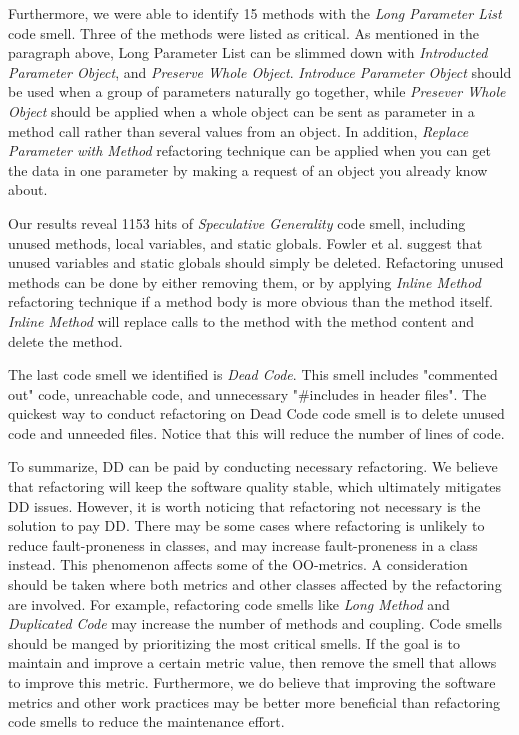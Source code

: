 Furthermore, we were able to identify 15 methods with the \textit{Long Parameter List} code smell. Three of the methods were listed as critical. As mentioned in the paragraph above, Long Parameter List can be slimmed down with \textit{Introducted Parameter Object}, and \textit{Preserve Whole Object}. \textit{Introduce Parameter Object} should be used when a group of parameters naturally go together, while \textit{Presever Whole Object} should be applied when a whole object can be sent as parameter in a method call rather than several values from an object. In addition, \textit{Replace Parameter with Method} refactoring technique can be applied when you can get the data in one parameter by making a request of an object you already know about\cite{fowler1999refactoring}.

Our results reveal 1153 hits of \textit{Speculative Generality} code smell, including unused methods, local variables, and static globals. Fowler et al.\cite{fowler1999refactoring} suggest that unused variables and static globals should simply be deleted. Refactoring unused methods can be done by either removing them, or by applying \textit{Inline Method} refactoring technique if a method body is more obvious than the method itself. \textit{Inline Method} will replace calls to the method with the method content and delete the method.

The last code smell we identified is \textit{Dead Code}. This smell includes "commented out" code, unreachable code, and unnecessary "\#includes in header files". The quickest way to conduct refactoring on Dead Code code smell is to delete unused code and unneeded files. Notice that this will reduce the number of lines of code.

To summarize, DD can be paid by conducting necessary refactoring. We believe that refactoring will keep the software quality stable, which ultimately mitigates DD issues. However, it is worth noticing that refactoring not necessary is the solution to pay DD. There may be some cases where refactoring is unlikely to reduce fault-proneness in classes, and may increase fault-proneness in a class instead\cite{hall2014some}. This phenomenon affects some of the OO-metrics. A consideration should be taken where both metrics and other classes affected by the refactoring are involved. For example, refactoring code smells like \textit{Long Method} and \textit{Duplicated Code} may increase the number of methods and coupling. Code smells should be manged by prioritizing the most critical smells. If the goal is to maintain and improve a certain metric value, then remove the smell that allows to improve this metric. Furthermore, we do believe that improving the software metrics and other work practices may be better more beneficial than refactoring code smells to reduce the maintenance effort.




